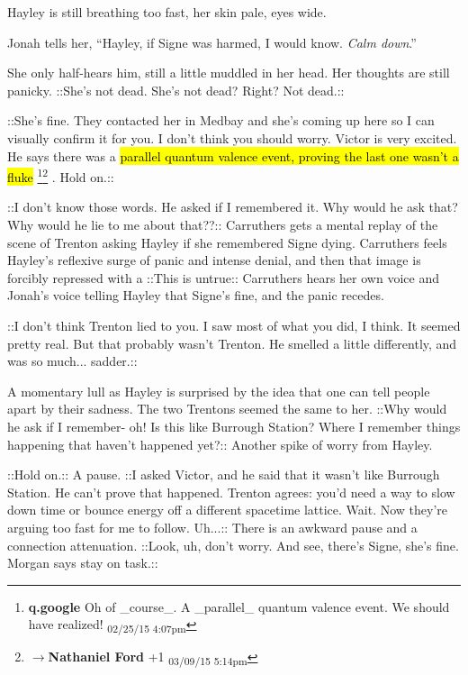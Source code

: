 Hayley is still breathing too fast, her skin pale, eyes wide.

Jonah tells her, ``Hayley, if Signe was harmed, I would know.  \textit{Calm down}.''

She only half-hears him, still a little muddled in her head.  Her thoughts are still panicky.   {\color[RGB]{255,153,0}::She's not dead.  She's not dead?   Right?  Not dead.::} 

 {\color[RGB]{153,0,255}::She's fine. They contacted her in Medbay and she's coming up here so I can visually confirm it for you.  I don't think you should worry.  Victor is very excited. He says there was a }  {\color[RGB]{153,0,255}\hl{parallel quantum valence event, proving the last one wasn't a fluke}} \footnote{\textbf{q.google }Oh of \_course\_.  A \_parallel\_ quantum valence event.  We should have realized! \textsubscript{02/25/15 4:07pm}}\footnote{$\rightarrow$\textbf{Nathaniel Ford }+1 \textsubscript{03/09/15 5:14pm}} {\color[RGB]{153,0,255}. Hold on.::} 

 {\color[RGB]{255,153,0}::I don't know those words.  He asked if I remembered it.  Why would he ask that?  Why would he lie to me about that??::  } Carruthers gets a mental replay of the scene of Trenton asking Hayley if she remembered Signe dying.  Carruthers feels Hayley's reflexive surge of panic and intense denial, and then that image is forcibly repressed with a  {\color[RGB]{255,153,0}::This is untrue::}   Carruthers hears her own voice and Jonah's voice telling Hayley that Signe's fine, and the panic recedes.

 {\color[RGB]{153,0,255}::I don't think Trenton lied to you. I saw most of what you did, I think. It seemed pretty real. But that probably wasn't Trenton. He smelled a little differently, and was so much... sadder.::} 

A momentary lull as Hayley is surprised by the idea that one can tell people apart by their sadness.  The two Trentons seemed the same to her.   {\color[RGB]{255,153,0}::Why would he ask if I remember- oh!  Is this like Burrough Station?   Where I remember things happening that haven't happened yet?:: } Another spike of worry from Hayley.

 {\color[RGB]{153,0,255}::Hold on.:: }  A pause.   {\color[RGB]{153,0,255}::I asked Victor, and he said that it wasn't like Burrough Station. He can't prove that happened. Trenton agrees: you'd need a way to slow down time or bounce energy off a different spacetime lattice. Wait. Now they're arguing too fast for me to follow. Uh...::}  There is an awkward pause and a connection attenuation.  {\color[RGB]{153,0,255}::Look, uh, don't worry.  And see, there's Signe, she's fine.  Morgan says stay on task.::} 

